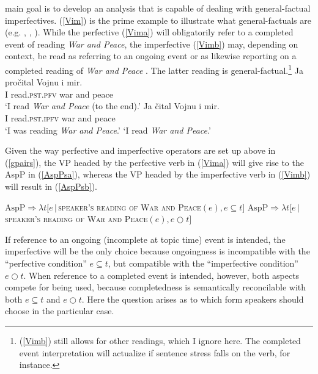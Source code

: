\documentclass[output=paper,colorlinks,citecolor=brown]{langscibook}
\begin{document}
 main goal is to develop an analysis that is capable of dealing with general-factual imperfectives.   
(\ref{Vim}) is the prime example to illustrate what general-factuals are (e.g. \citealt{Forsyth1970}, \citealt{Comrie1976}, \citealt{Klein1995}). While the perfective (\ref{Vima}) will obligatorily refer to a completed event of reading \textit{War and Peace}, the imperfective (\ref{Vimb}) may, depending on context, be read as referring to an ongoing event  or as likewise reporting on a completed reading of \textit{War and Peace} . The latter reading is general-factual.\footnote{(\ref{Vimb}) still allows for other readings, which I ignore here. The completed event interpretation will actualize if sentence stress falls on the verb, for instance.}   
\ea\label{Vim}
\ea \gll Ja pročital Vojnu i mir. \\
I read.\textsc{pst.pfv} war and peace \\
\glt `I read \textit{War and Peace} (to the end).'\label{Vima}
\ex \gll Ja čital Vojnu i mir.\label{Vimb}\\
I read.\textsc{pst.ipfv} war and peace \\
\ea `I was reading \textit{War and Peace}.'\label{Vimb-i}
\ex `I read \textit{War and Peace}.'\label{Vimb-ii}
\z\z\z

\noindent Given the way perfective and imperfective operators are set up above in (\ref{gpairs}), the VP headed by the perfective verb in (\ref{Vima}) will give rise to the AspP in (\ref{AspPsa}), whereas the VP headed by the imperfective verb in (\ref{Vimb}) will result in (\ref{AspPsb}).

\ea\label{AspPs}
\ea $\text{AspP} \Rightarrow \lambda t [e \,|\, $\textsc{speaker's reading of War and Peace}$(e), e \subseteq t ]$ \label{AspPsa}
\ex $\text{AspP} \Rightarrow \lambda t [e \,|\, $\textsc{speaker's reading of War and Peace}$(e), e \bigcirc t ]$ \label{AspPsb}
\z\z

\noindent If reference to an ongoing (incomplete at topic time) event is intended, the imperfective will be the only choice because ongoingness is incompatible with the ``perfective condition'' $e \subseteq t$, but compatible with the ``imperfective condition'' $e \bigcirc t$. When reference to a completed event is intended, however, both aspects compete for being used, because completedness is semantically reconcilable with both $e \subseteq t$ and $e \bigcirc t$. Here the question arises as to which form speakers should choose in the particular case. 
\end{document}
